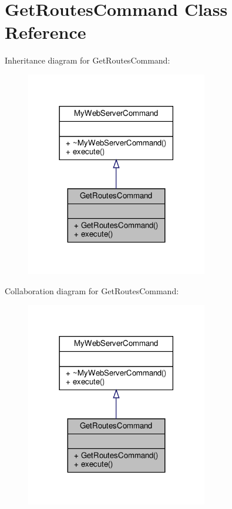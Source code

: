 \hypertarget{classGetRoutesCommand}{}\section{Get\+Routes\+Command Class Reference}
\label{classGetRoutesCommand}


Inheritance diagram for Get\+Routes\+Command\+:\nopagebreak
\begin{figure}[H]
\begin{center}
\leavevmode
\includegraphics[width=225pt]{classGetRoutesCommand__inherit__graph}
\end{center}
\end{figure}


Collaboration diagram for Get\+Routes\+Command\+:\nopagebreak
\begin{figure}[H]
\begin{center}
\leavevmode
\includegraphics[width=225pt]{classGetRoutesCommand__coll__graph}
\end{center}
\end{figure}
